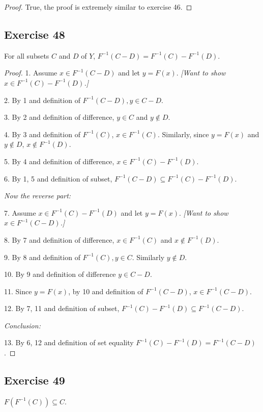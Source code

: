 \documentclass[14pt]{extarticle}
\begin{document}
\begin{proof}
    True, the proof is extremely similar to exercise 46.
\end{proof}

\subsection{Exercise 48}
For all subsets $C$ and $D$ of $Y$, \(F^{-1}(C-D) = F^{-1}(C) - F^{-1}(D)\).

\begin{proof}
    1. Assume \(x \in F^{-1}(C-D)\) and let $y = F(x)$. {\it [Want to show \(x \in F^{-1}(C) - F^{-1}(D)\).]}

    2. By 1 and definition of \(F^{-1}(C-D), y \in C-D\).

    3. By 2 and definition of difference, \(y \in C\) and \(y \notin D\).

    4. By 3 and definition of \(F^{-1}(C)\), \(x \in F^{-1}(C)\). Similarly, since $y = F(x)$ and $y \notin D$,
    \(x \notin F^{-1}(D)\).

    5. By 4 and definition of difference, \(x \in F^{-1}(C) - F^{-1}(D)\).

    6. By 1, 5 and definition of subset, \(F^{-1}(C-D) \subseteq F^{-1}(C) - F^{-1}(D)\).

        {\it Now the reverse part:}

    7. Assume \(x \in F^{-1}(C) - F^{-1}(D)\) and let $y = F(x)$. {\it [Want to show \(x \in F^{-1}(C-D)\).]}

    8. By 7 and definition of difference, \(x \in F^{-1}(C)\) and \(x \notin F^{-1}(D)\).

    9. By 8 and definition of \(F^{-1}(C), y \in C\). Similarly \(y \notin D\).

    10. By 9 and definition of difference \(y \in C-D\).

    11. Since $y = F(x)$, by 10 and definition of \(F^{-1}(C-D)\), \(x \in F^{-1}(C-D)\).

    12. By 7, 11 and definition of subset, \(F^{-1}(C) - F^{-1}(D) \subseteq F^{-1}(C-D)\).

        {\it Conclusion:}

    13. By 6, 12 and definition of set equality \(F^{-1}(C) - F^{-1}(D) = F^{-1}(C-D)\).
\end{proof}

\subsection{Exercise 49}
\(F(F^{-1}(C)) \subseteq C\).
\end{document}
